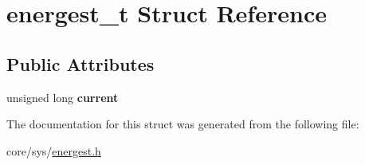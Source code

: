 \hypertarget{structenergest__t}{\section{energest\-\_\-t Struct Reference}
\label{structenergest__t}
}
\subsection*{Public Attributes}
\begin{DoxyCompactItemize}
\item 
\hypertarget{structenergest__t_a7bf732582408e8112f77add767fff075}{unsigned long {\bfseries current}}\label{structenergest__t_a7bf732582408e8112f77add767fff075}

\end{DoxyCompactItemize}


The documentation for this struct was generated from the following file\-:\begin{DoxyCompactItemize}
\item 
core/sys/\hyperlink{energest_8h}{energest.\-h}\end{DoxyCompactItemize}
